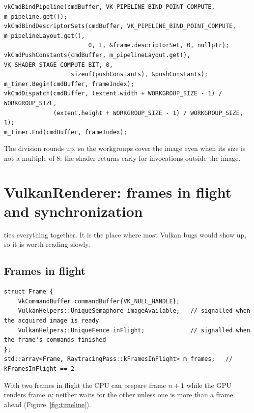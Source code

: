 \documentclass[11pt,a4paper]{article}
\begin{document}
\begin{lstlisting}
vkCmdBindPipeline(cmdBuffer, VK_PIPELINE_BIND_POINT_COMPUTE, m_pipeline.get());
vkCmdBindDescriptorSets(cmdBuffer, VK_PIPELINE_BIND_POINT_COMPUTE, m_pipelineLayout.get(),
                        0, 1, &frame.descriptorSet, 0, nullptr);
vkCmdPushConstants(cmdBuffer, m_pipelineLayout.get(), VK_SHADER_STAGE_COMPUTE_BIT, 0,
                   sizeof(pushConstants), &pushConstants);
m_timer.Begin(cmdBuffer, frameIndex);
vkCmdDispatch(cmdBuffer, (extent.width + WORKGROUP_SIZE - 1) / WORKGROUP_SIZE,
              (extent.height + WORKGROUP_SIZE - 1) / WORKGROUP_SIZE, 1);
m_timer.End(cmdBuffer, frameIndex);
\end{lstlisting}

The division rounds up, so the workgroups cover the image even when its size is not a multiple of 8; the shader returns early for invocations outside the image.

\section{VulkanRenderer: frames in flight and synchronization}
\label{sec:sync}

 ties everything together. It is the place where most Vulkan bugs would show up, so it is worth reading slowly.

\subsection{Frames in flight}

\begin{lstlisting}
struct Frame {
    VkCommandBuffer commandBuffer{VK_NULL_HANDLE};
    VulkanHelpers::UniqueSemaphore imageAvailable;   // signalled when the acquired image is ready
    VulkanHelpers::UniqueFence inFlight;             // signalled when the frame's commands finished
};
std::array<Frame, RaytracingPass::kFramesInFlight> m_frames;   // kFramesInFlight == 2
\end{lstlisting}

With two frames in flight the CPU can prepare frame $n+1$ while the GPU renders frame $n$; neither waits for the other unless one is more than a frame ahead (Figure~\ref{fig:timeline}).
\end{document}
